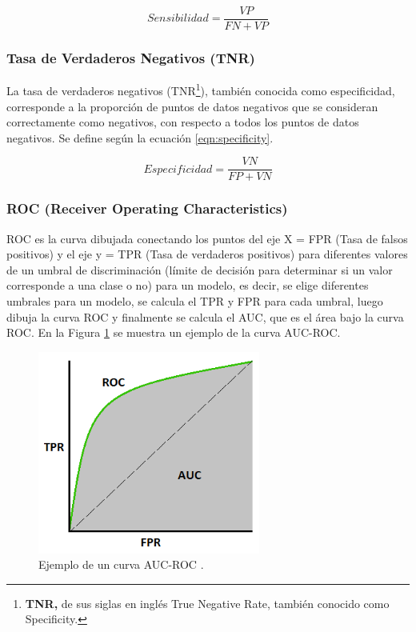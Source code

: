 \begin{equation}
Sensibilidad = \frac{VP}{FN+VP}
\label{eqn:sensibility}
\end{equation}

\subsubsection{Tasa de Verdaderos Negativos (TNR) }

La tasa de verdaderos negativos (TNR\footnote{\textbf{TNR, }de sus siglas en ingl\'{e}s True Negative Rate, tambi\'{e}n conocido como Specificity.}), tambi\'{e}n conocida como especificidad, corresponde a la proporción de puntos de datos negativos que se consideran correctamente como negativos, con respecto a todos los puntos de datos negativos. Se define seg\'{u}n la ecuaci\'{o}n \ref{eqn:specificity}.

\begin{equation}
Especificidad = \frac{VN}{FP+VN}
\label{eqn:specificity}
\end{equation}

\subsubsection{ROC (Receiver Operating Characteristics)}

ROC es la curva dibujada conectando los puntos del eje X = FPR (Tasa de falsos positivos) y el eje y = TPR (Tasa de verdaderos positivos) para diferentes valores de un umbral de discriminaci\'{o}n (l\'{i}mite de decisi\'{o}n para determinar si un valor corresponde a una clase o no) para un modelo, es decir, se elige diferentes umbrales para un modelo, se calcula el TPR y FPR para cada umbral, luego dibuja la curva ROC y finalmente se calcula el AUC, que es el \'{a}rea bajo la curva ROC. En la Figura \ref{fig:auc_roc} se muestra un ejemplo de la curva AUC-ROC.

\begin{figure}[h!]
  \begin{center}	\includegraphics[width=0.65\textwidth, frame]{imagenes/Cap4/auc_roc}
  \caption{Ejemplo de un curva AUC-ROC \protect\cite{Reference62}.}
  \label{fig:auc_roc}
  \end{center}
\end{figure}


